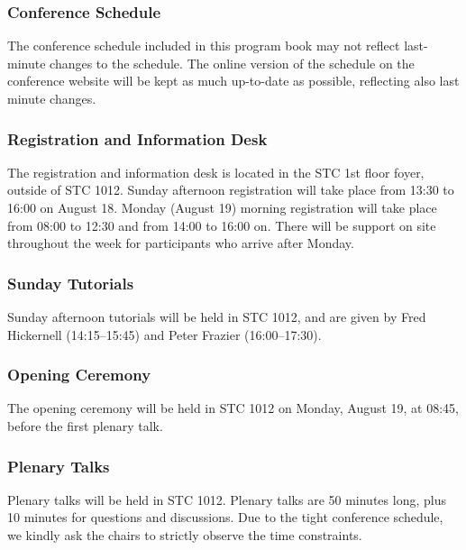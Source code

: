 

\subsubsection{Conference Schedule}

The conference schedule included in this program book may not reflect last-minute changes to the schedule. The online version of the schedule on the conference website
will be kept as much up-to-date as possible, reflecting also last minute changes. 

\subsubsection{Registration and Information Desk}

The registration and information desk is located in the STC 1st floor foyer, outside of STC 1012.
Sunday afternoon registration will take place from 13:30 to 16:00 on August 18. Monday (August 19) morning registration will take place from
08:00 to 12:30 and from 14:00 to 16:00 on. There will be support on site throughout the week for participants who arrive after Monday. 


\subsubsection{Sunday Tutorials}

Sunday afternoon tutorials will be held in STC 1012, and are given by 
Fred Hickernell (14:15--15:45) and Peter Frazier (16:00--17:30). 


\subsubsection{Opening Ceremony}

The opening ceremony will be held in STC 1012 on Monday, August 19,
at 08:45, before the first plenary talk.

\subsubsection{Plenary Talks}

Plenary talks will be held in STC 1012. Plenary talks are 50 minutes long, plus 10 minutes for questions and discussions. Due to the
tight conference schedule, we kindly ask the chairs to strictly
observe the time constraints.

